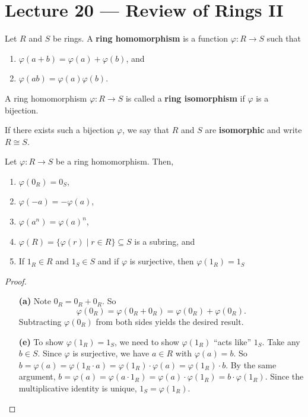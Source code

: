 \section{Lecture 20 — Review of Rings II}

\begin{definition}
	Let $R$ and $S$ be rings. A \textbf{ring homomorphism} is a function $\varphi\colon R\to S$ such that
	\begin{enumerate}
		\item $\varphi(a+b)=\varphi(a)+\varphi(b)$, and
		\item $\varphi(ab)=\varphi(a)\varphi(b)$.
	\end{enumerate}
\end{definition}

\begin{definition}
	A ring homomorphism $\varphi\colon R\to S$ is called a \textbf{ring isomorphism} if $\varphi$ is a bijection.

	If there exists such a bijection $\varphi$, we say that $R$ and $S$ are \textbf{isomorphic} and write $R\cong S$.
\end{definition}

\begin{proposition}
	Let $\varphi\colon R\to S$ be a ring homomorphism. Then,
	\begin{enumerate}
		\item $\varphi(0_R)=0_S$,
		\item $\varphi(-a)=-\varphi(a)$,
		\item $\varphi(a^n)=\varphi(a)^n$,
		\item $\varphi(R)=\{\varphi(r)\mid r\in R\}\subseteq S$ is a subring, and
		\item If $1_R\in R$ and $1_S\in S$ and if $\varphi$ is surjective, then $\varphi(1_R)=1_S$
	\end{enumerate}
\end{proposition}

\begin{proof}\phantom{x}
	\begin{itemize}
		\item[\textbf{(a)}] Note $0_R=0_R+0_R$. So
		$$\varphi(0_R)=\varphi(0_R+0_R)=\varphi(0_R)+\varphi(0_R).$$
		Subtracting $\varphi(0_R)$ from both sides yields the desired result.
		\item[\textbf{(e)}] To show $\varphi(1_R)=1_S$, we need to show $\varphi(1_R)$ ``acts like'' $1_S$. Take any $b\in S$. Since $\varphi$ is surjective, we have $a\in R$ with $\varphi(a)=b$. So $b=\varphi(a)=\varphi(1_R\cdot a)=\varphi(1_R)\cdot\varphi(a)=\varphi(1_R)\cdot b$. By the same argument, $b=\varphi(a)=\varphi(a\cdot 1_R)=\varphi(a)\cdot\varphi(1_R)=b\cdot\varphi(1_R)$. Since the multiplicative identity is unique, $1_S=\varphi(1_R)$.
	\end{itemize}
\end{proof}


